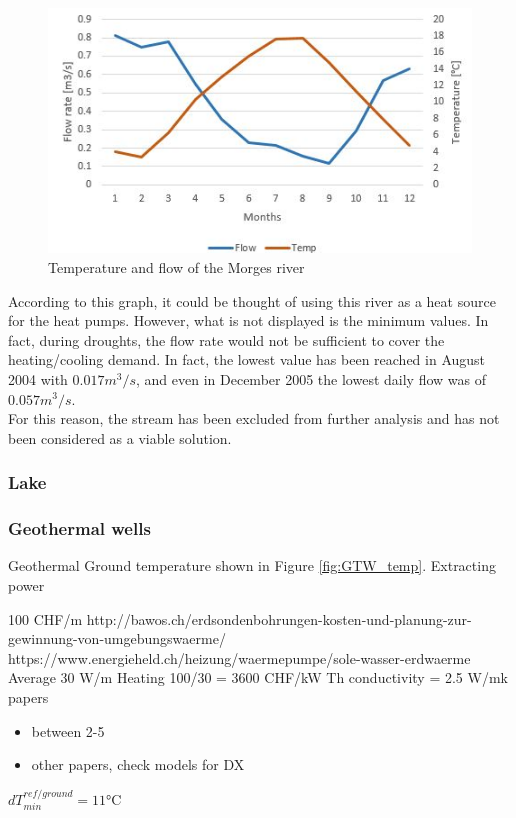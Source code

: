 \documentclass{article}
\begin{document}
\begin{figure}[h!]
\centering
\includegraphics[width=1\textwidth]{river.JPG}
\caption{Temperature and flow of the Morges river}
\label{fig:river}
\end{figure}

According to this graph, it could be thought of using this river as a heat source for the heat pumps. However, what is not displayed is the minimum values. In fact, during droughts, the flow rate would not be sufficient to cover the heating/cooling demand. In fact, the lowest value has been reached in August 2004 with $0.017 m^3/s$, and even in December 2005 the lowest daily flow was of $0.057 m^3/s$. \\
For this reason, the stream has been excluded from further analysis and has not been considered as a viable solution.

\subsubsection{Lake}

\subsubsection{Geothermal wells}
Geothermal
Ground temperature shown in Figure \ref{fig:GTW_temp}.
Extracting power

100 CHF/m
http://bawos.ch/erdsondenbohrungen-kosten-und-planung-zur-gewinnung-von-umgebungswaerme/ 
https://www.energieheld.ch/heizung/waermepumpe/sole-wasser-erdwaerme 
Average 30 W/m
Heating 100/30 = 3600 CHF/kW
Th conductivity = 2.5 W/mk 
papers 
\begin{itemize}
\item between 2-5 \cite{jiaReviewEffectiveThermal2019}
\item other papers, check models for DX
\end{itemize}
$dT_{min}^{ref/ground} = 11 \si{\celsius}$
\end{document}
